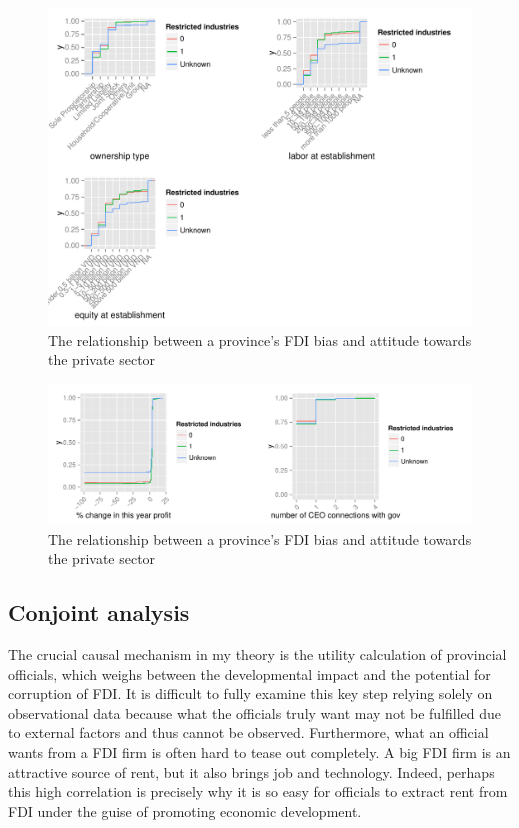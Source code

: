 \begin{figure}[!ht]
\includegraphics[width=\textwidth, height=\textheight,keepaspectratio]{../figure/by_restrict_owner-labor-equity}
\caption{The relationship between a province's FDI bias and attitude towards the private sector}
\label{fig:by_restrict_owner}
\end{figure}

\begin{figure}[!ht]
\includegraphics[width=\textwidth, height=\textheight,keepaspectratio]{../figure/by_restrict_performance-connection}
\caption{The relationship between a province's FDI bias and attitude towards the private sector}
\label{fig:by_restrict_performance}
\end{figure}

\subsection{Conjoint analysis}

The crucial causal mechanism in my theory is the utility calculation of provincial officials, which weighs between the developmental impact and the potential for corruption of FDI. It is difficult to fully examine this key step relying solely on observational data because what the officials truly want may not be fulfilled due to external factors and thus cannot be observed. Furthermore, what an official wants from a FDI firm is often hard to tease out completely. A big FDI firm is an attractive source of rent, but it also brings job and technology. Indeed, perhaps this high correlation is precisely why it is so easy for officials to extract rent from FDI under the guise of promoting economic development.

